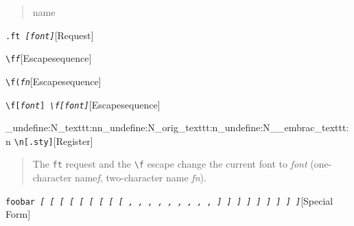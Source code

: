 \documentclass{book}
\begin{document}
%
\begin{quote}
\unskip{\parskip=0pt\noindent}%
name
\end{quote}

\noindent\texttt{\texttt{.ft} \EmbracOn{}\textnormal{\textsl{[\EmbracOff{}\textnormal{\textsl{font}}\EmbracOn{}]}}\EmbracOff{}}\hfill[Request]



%
\noindent\texttt{\texttt{\textbackslash{}f}\textnormal{\textsl{f}}\texttt{}}\hfill[Escape\hbox{}sequence]



%
\noindent\texttt{\texttt{\textbackslash{}f(}\textnormal{\textsl{fn}}\texttt{}}\hfill[Escape\hbox{}sequence]



%
\noindent\texttt{\texttt{\textbackslash{}f[}\textnormal{\textsl{font}}\texttt{]} \EmbracOn{}\textnormal{\textsl{\texttt{\textbackslash{}f[}\EmbracOff{}\textnormal{\textsl{font}}\EmbracOn{}\texttt{]}}}\EmbracOff{}}\hfill[Escape\hbox{}sequence]


\ExplSyntaxOn%
\cs_undefine:N{\embrac_texttt:nn}\cs_undefine:N{\embrac_orig_texttt:n}\cs_undefine:N{\__embrac_texttt:n}%
\ExplSyntaxOff%
%
\noindent\texttt{\texttt{\textbackslash{}n[.sty]}}\hfill[Register]



%
\begin{quote}
\unskip{\parskip=0pt\noindent}%
The \texttt{ft} request and the \texttt{\textbackslash{}f} escape change the current font
to \textsl{font} (one-character name\hbox{}\textsl{f}, two-character name
\textsl{fn}).
\end{quote}

\noindent\texttt{foobar \EmbracOn{}\textnormal{\textsl{[ \EmbracOff{}\textnormal{[}\EmbracOn{} \textsl{[} \texttt{[} \texttt{[} \EmbracOff{}\textnormal{\textsl{[}}\EmbracOn{} \EmbracOff{}\textnormal{\texttt{[}}\EmbracOn{} \EmbracOff{}\textnormal{\texttt{\textsl{[}}}\EmbracOn{} \EmbracOff{}\textnormal{\texttt{[}}\EmbracOn{} , \EmbracOff{}\textnormal{,}\EmbracOn{} \textsl{,} \texttt{,} \texttt{,} \EmbracOff{}\textnormal{\textsl{,}}\EmbracOn{} \EmbracOff{}\textnormal{\texttt{,}}\EmbracOn{} \EmbracOff{}\textnormal{\texttt{\textsl{,}}}\EmbracOn{} \EmbracOff{}\textnormal{\texttt{,}}\EmbracOn{} ] \EmbracOff{}\textnormal{]}\EmbracOn{} \textsl{]} \texttt{]} \texttt{]} \EmbracOff{}\textnormal{\textsl{]}}\EmbracOn{} \EmbracOff{}\textnormal{\texttt{]}}\EmbracOn{} \EmbracOff{}\textnormal{\texttt{\textsl{]}}}\EmbracOn{} \EmbracOff{}\textnormal{\texttt{]}}\EmbracOn{}}}\EmbracOff{}}\hfill[Special Form]
\end{document}
